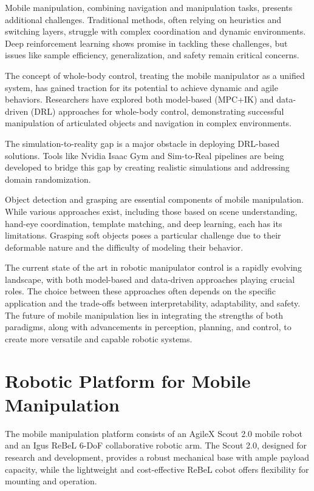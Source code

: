 Mobile manipulation, combining navigation and manipulation tasks, presents additional challenges. Traditional methods, 
often relying on heuristics and switching layers, struggle with complex coordination and dynamic environments. 
Deep reinforcement learning shows promise in tackling these challenges, but issues like sample efficiency, generalization,
and safety remain critical concerns.

The concept of whole-body control, treating the mobile manipulator as a unified system, has gained traction for its potential
to achieve dynamic and agile behaviors. Researchers have explored both model-based (MPC+IK) and data-driven (DRL) approaches
for whole-body control, demonstrating successful manipulation of articulated objects and navigation in complex environments.

The simulation-to-reality gap is a major obstacle in deploying DRL-based solutions. Tools like Nvidia Isaac Gym and
Sim-to-Real pipelines are being developed to bridge this gap by creating realistic simulations and addressing domain 
randomization.

Object detection and grasping are essential components of mobile manipulation. While various approaches exist, 
including those based on scene understanding, hand-eye coordination, template matching, and deep learning, each has
its limitations. Grasping soft objects poses a particular challenge due to their deformable nature and the difficulty
of modeling their behavior.

The current state of the art in robotic manipulator control is a rapidly evolving landscape, with both model-based 
and data-driven approaches playing crucial roles. The choice between these approaches often depends on the specific 
application and the trade-offs between interpretability, adaptability, and safety. The future of mobile manipulation 
lies in integrating the strengths of both paradigms, along with advancements in perception, planning, and control, 
to create more versatile and capable robotic systems.

\section{Robotic Platform for Mobile Manipulation}

The mobile manipulation platform consists of an AgileX Scout 2.0 mobile robot and an Igus ReBeL 6-DoF collaborative
robotic arm. The Scout 2.0, designed for research and development, provides a robust mechanical base with ample 
payload capacity, while the lightweight and cost-effective ReBeL cobot offers flexibility for mounting and operation.

